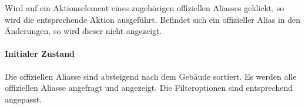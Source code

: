 Wird auf ein Aktionselement eines zugehörigen offiziellen Aliasses geklickt, so wird die entsprechende Aktion ausgeführt.
Befindet sich ein offizieller Alias in den Änderungen, so wird dieser nicht angezeigt.

\paragraph*{Initialer Zustand}
Die offiziellen Aliasse sind absteigend nach dem Gebäude sortiert.
Es werden alle offiziellen Aliasse angefragt und angezeigt.
Die Filteroptionen sind entsprechend angepasst.
